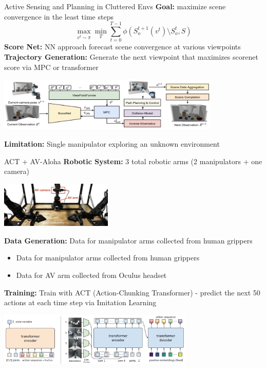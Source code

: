 \documentclass{beamer}
\begin{document}
\begin{frame}[t]{Active Sensing and Planning in Cluttered Envs}
    \small
    \textbf{Goal:} maximize scene convergence in the least time steps
         \[
        \max_{v^t \sim \pi} \min_T \sum_{t=0}^{T-1} \phi(S_o^{t+1}(v^t) \setminus S_o^t, S)
        \]
    \newline
    \textbf{Score Net:} NN approach forecast scene convergence at various viewpoints 
    \newline
    \textbf{Trajectory Generation:} Generate the next viewpoint that maximizes scorenet score via MPC or transformer
    \begin{center}
        \includegraphics[width=0.8\textwidth]{./img/action_sensing_0.png}
    \end{center}
    \vspace{1em}


    \textbf{Limitation:} Single manipulator exploring an unknown environment 
\end{frame}


\begin{frame}[t]{ACT + AV-Aloha}
    \small
    \textbf{Robotic System:} 3 total robotic arms (2 manipulators + one camera)
    \begin{center}
    \includegraphics[width=0.4\textwidth]{./img/av_aloha_0.png}
    \end{center}
    \pause
    \textbf{Data Generation:} Data for manipulator arms collected from human grippers
    \begin{itemize}[label=-]
      \item Data for manipulator arms collected from human grippers
      \item Data for AV arm collected from Oculus headset
    \end{itemize}
    \pause
    \textbf{Training:} Train with ACT (Action-Chunking Transformer) - predict the next 50 actions at each time step via Imitation Learning
    \begin{center}
    \includegraphics[width=0.7\textwidth]{./img/av_aloha_1.png}
    \end{center}
\end{frame}
\end{document}
